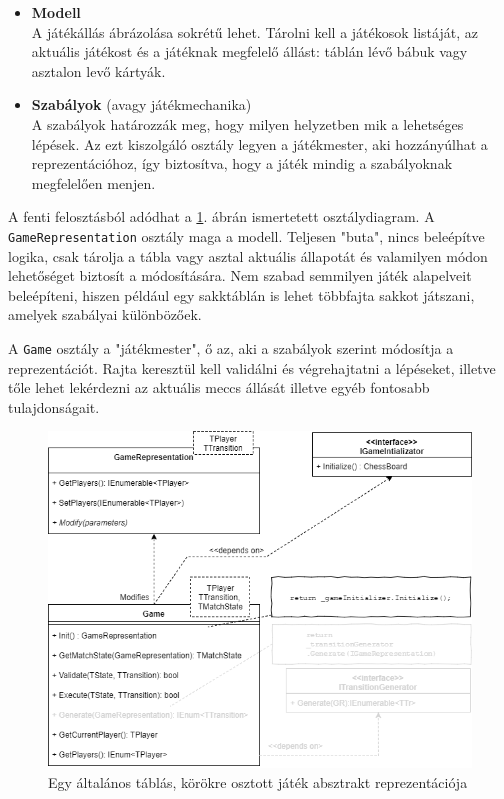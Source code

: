 \documentclass[twoside, a4paper, 12pt]{article}
\begin{document}
\begin{itemize}
	\item \textbf{Modell} \\
	A játékállás ábrázolása sokrétű lehet. Tárolni kell a játékosok listáját, az aktuális játékost és a játéknak megfelelő állást: táblán lévő bábuk vagy asztalon levő kártyák.
	
	\item \textbf{Szabályok} (avagy játékmechanika) \\
	A szabályok határozzák meg, hogy milyen helyzetben mik a lehetséges lépések. Az ezt kiszolgáló osztály legyen a játékmester, aki hozzányúlhat a reprezentációhoz, így biztosítva, hogy a játék mindig a szabályoknak megfelelően menjen.
\end{itemize}

A fenti felosztásból adódhat a \ref{fig:boardGameAbstractClassDiagram}. ábrán ismertetett osztálydiagram. A \texttt{GameRepresentation} osztály maga a modell. Teljesen "buta", nincs beleépítve logika, csak tárolja a tábla vagy asztal aktuális állapotát és valamilyen módon lehetőséget biztosít a módosítására. Nem szabad semmilyen játék alapelveit beleépíteni, hiszen például egy sakktáblán is lehet többfajta sakkot játszani, amelyek szabályai különbözőek.

A \texttt{Game} osztály a "játékmester", ő az, aki a szabályok szerint módosítja a reprezentációt. Rajta keresztül kell validálni és végrehajtatni a lépéseket, illetve tőle lehet lekérdezni az aktuális meccs állását illetve egyéb fontosabb tulajdonságait.

\begin{figure}[htbp]
	\centering
	\includegraphics[width=\textwidth]{img/boardGameAbstractClassDiagram.png}
	\caption{Egy általános táblás, körökre osztott játék absztrakt reprezentációja}
	\label{fig:boardGameAbstractClassDiagram}
\end{figure}
\end{document}
